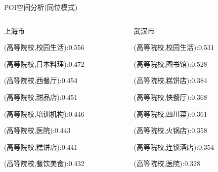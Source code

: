 \begin{frame}[c]{POI空间分析(同位模式)}
    \scriptsize
    \begin{columns}
        \begin{column}{0.333 \textwidth}
        \alert{上海市}

        \vspace{1em}
        (高等院校,校园生活):0.556

        \vspace{1em}
        (高等院校,日本料理):0.472

        \vspace{1em}
        (高等院校,西餐厅):0.454
        \vspace{1em}

        (高等院校,甜品店):0.451
        \vspace{1em}

        (高等院校,培训机构):0.446
        \vspace{1em}

        (高等院校,医院):0.443
        \vspace{1em}

        (高等院校,糕饼店):0.441
        \vspace{1em}

        (高等院校,餐饮美食):0.432
        \end{column}

        \begin{column}{0.333 \textwidth}
        \alert{武汉市}
        \vspace{1em}

        (高等院校,校园生活):0.531
        \vspace{1em}

        (高等院校,图书馆):0.528
        \vspace{1em}

        (高等院校,糕饼店):0.384
        \vspace{1em}

        (高等院校,快餐厅):0.368
        \vspace{1em}

        (高等院校,四川菜):0.361
        \vspace{1em}

        (高等院校,火锅店):0.358 
        \vspace{1em}

        (高等院校,连锁酒店):0.354
        \vspace{1em}

        (高等院校,医院):0.328
        \end{column}


\end{columns}
\end{frame}
